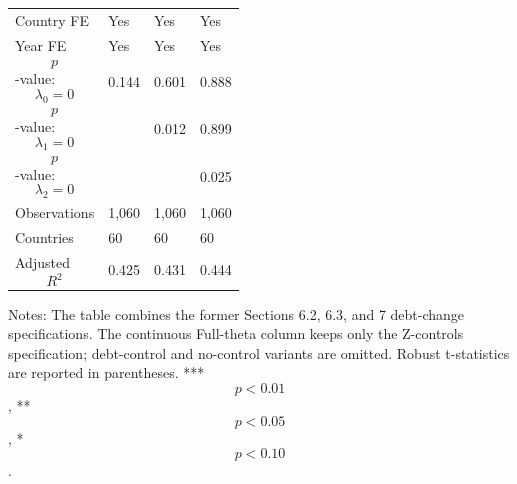 \begin{table}[H]
\begin{threeparttable}
\begin{tabularx}{\textwidth}{lYYY}
Country FE & Yes & Yes & Yes \\
Year FE & Yes & Yes & Yes \\
$$p$$-value: $$\lambda_0=0$$ & 0.144 & 0.601 & 0.888 \\
$$p$$-value: $$\lambda_1=0$$ &  & 0.012 & 0.899 \\
$$p$$-value: $$\lambda_2=0$$ &  &  & 0.025 \\
Observations & 1,060 & 1,060 & 1,060 \\
Countries & 60 & 60 & 60 \\
Adjusted $$R^2$$ & 0.425 & 0.431 & 0.444 \\
\bottomrule
\end{tabularx}
\begin{tablenotes}[flushleft]\footnotesize
\item Notes: The table combines the former Sections 6.2, 6.3, and 7 debt-change specifications. The continuous Full-theta column keeps only the Z-controls specification; debt-control and no-control variants are omitted. Robust t-statistics are reported in parentheses. *** $$p<0.01$$, ** $$p<0.05$$, * $$p<0.10$$.
\end{tablenotes}
\end{threeparttable}
\end{table}
